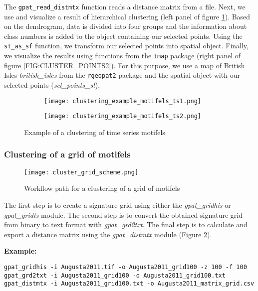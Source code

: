 The {\tt gpat\_read\_distmtx} function reads a distance matrix from a file. 
Next, we use and visualize a result of hierarchical clustering (left panel of figure \ref{FIG:CLUSTER_POINTSTS2}).
Based on the dendrogram, data is divided into four groups and the information about class numbers is added to the object containing our selected points.
Using the {\tt st\_as\_sf} function, we transform our selected points into spatial object.
Finally, we visualize the results using functions from the {\tt tmap} package (right panel of figure \ref{FIG:CLUSTER_POINTS2}).
For this purpose, we use a map of British Isles {\it british\_isles} from the {\tt rgeopat2} package and the spatial object with our selected points ({\it sel\_points\_st}).

\begin{figure}[H]
  \begin{subfigure}[b]{0.5\textwidth}
    \texttt{[image: clustering\_example\_motifels\_ts1.png]}
  \end{subfigure}
  \begin{subfigure}[b]{0.5\textwidth}
    \texttt{[image: clustering\_example\_motifels\_ts2.png]}
  \end{subfigure}
  \caption{Example of a clustering of time series motifels}
  \label{FIG:CLUSTER_POINTSTS2}
\end{figure}

\FloatBarrier

\subsubsection{Clustering of a grid of motifels}

\begin{figure}[H]
	\centering
	\texttt{[image: cluster\_grid\_scheme.png]}
	\caption{Workflow path for a clustering of a grid of motifels}
	\label{FIG:CLUSTER_GRID}
\end{figure}

The first step is to create a signature grid using either the {\it gpat\_gridhis} or {\it gpat\_gridts} module.
The second step is to convert the obtained signature grid from binary to text format with {\it gpat\_grd2txt}.
The final step is to calculate and export a distance matrix using the {\it gpat\_distmtx} module (Figure \ref{FIG:CLUSTER_GRID}).

{\bf Example:}

\begin{minipage}{\linewidth}
\begin{lstlisting}
gpat_gridhis -i Augusta2011.tif -o Augusta2011_grid100 -z 100 -f 100
gpat_grd2txt -i Augusta2011_grid100 -o Augusta2011_grid100.txt
gpat_distmtx -i Augusta2011_grid100.txt -o Augusta2011_matrix_grid.csv
\end{lstlisting}
\end{minipage}

